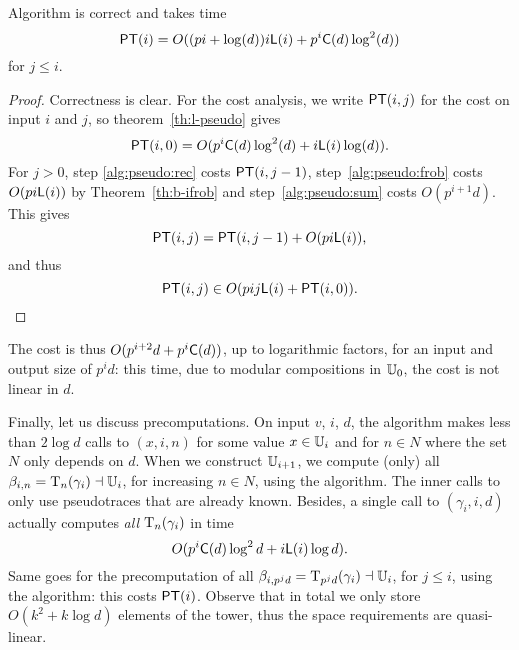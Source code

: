 \begin{theorem}
  \label{th:b-pseudo}
  Algorithm  is correct and takes time
  \begin{equation}
    \label{eq:97}
    \mathsf{PT}(i)=O((pi+\log (d))i\mathsf{L}(i)+p^i\mathsf{C}(d)\log^2 (d))    
  \end{equation}
  for $j \le
  i$.
\end{theorem}
\begin{proof}
  Correctness is clear. For the cost analysis, we write $\mathsf{PT}(i,j)$
  for the cost on input $i$ and $j$, so theorem~\ref{th:l-pseudo}
  gives 
  \begin{equation}
    \label{eq:101}
    \mathsf{PT}(i,0)=O(p^i\mathsf{C}(d)\log^2 (d) + i \mathsf{L}(i)\log(d))
    \text{.} 
  \end{equation}
  For $j>0$, step \ref{alg:pseudo:rec} costs $\mathsf{PT}(i,j-1)$,
  step~\ref{alg:pseudo:frob} costs $O(p i \mathsf{L}(i))$ by
  Theorem~\ref{th:b-ifrob} and step~\ref{alg:pseudo:sum} costs
  $O(p^{i+1}d)$. This gives 
  \begin{equation}
    \label{eq:102}
    \mathsf{PT}(i,j) = \mathsf{PT}(i,j-1) +O(p i \mathsf{L}(i))
    \text{,}
  \end{equation}
  and thus 
  \begin{equation}
    \label{eq:103}
    \mathsf{PT}(i,j) \in O(pij\mathsf{L}(i) + \mathsf{PT}(i,0))
    \text{.}
  \end{equation}
\end{proof}

The cost is thus $O(p^{i+2}d+p^i\mathsf{C}(d))$, up to logarithmic
factors, for an input and output size of $p^id$: this time, due to
modular compositions in $\mathbb{U}_0$, the cost is not linear in $d$.

Finally, let us discuss precomputations. On input $v$, $i$, $d$, the
algorithm 
makes less than $2\log d$ calls to
$(x,i,n)$ for
some value $x\in\mathbb{U}_i$ and for $n\in N$ where the set $N$ only depends
on $d$. When we construct $\mathbb{U}_{i+1}$, we compute (only) all
$\beta_{i,n}=\operatorname{T}_{n}(\gamma_i) \dashv\mathbb{U}_i$, for increasing $n\in N$,
using the 
algorithm. The inner calls to
 only use
pseudotraces that are already known. Besides, a single call to
$(\gamma_i,i,d)$
actually computes {\em all} $\operatorname{T}_{n}(\gamma_i)$ in time
\begin{equation}
  \label{eq:104}
  O(p^i\mathsf{C}(d)\log^2 d + i
  \mathsf{L}(i)\log d)
  \text{.}
\end{equation}
Same goes for the precomputation of all
$\beta_{i,p^jd}=\operatorname{T}_{p^jd}(\gamma_i) \dashv\mathbb{U}_i$, for $j\le i$, using
the  algorithm: this costs $\mathsf{PT}(i)$. Observe that in
total we only store $O(k^2 + k\log d)$ elements of the tower, thus the
space requirements are quasi-linear.

